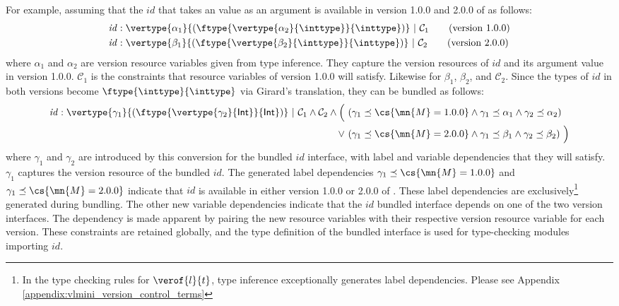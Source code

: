 For example, assuming that the $\mathit{id}$ that takes an \inttype{} value as an argument is available in version 1.0.0 and 2.0.0 of  as follows:
\begin{align*}
\mathit{id} &: \vertype{\alpha_1}{(\ftype{\vertype{\alpha_2}{\inttype}}{\inttype})}\ |\ \mathcal{C}_1 \tag{\textnormal{version 1.0.0}}\\
\mathit{id} &: \vertype{\beta_1}{(\ftype{\vertype{\beta_2}{\inttype}}{\inttype})}\ |\ \mathcal{C}_2 \tag{\textnormal{version 2.0.0}}
\end{align*}
where $\alpha_1$ and $\alpha_2$ are version resource variables given from type inference. They capture the version resources of $\mathit{id}$ and its argument value in version 1.0.0. $\mathcal{C}_1$ is the constraints that resource variables of version 1.0.0 will satisfy. Likewise for $\beta_1$, $\beta_2$, and $\mathcal{C}_2$.
Since the types of $\mathit{id}$ in both versions become $\ftype{\inttype}{\inttype}$ via Girard's translation, they can be bundled as follows:
\begin{align*}
\mathit{id} : \vertype{\gamma_1}{(\ftype{\vertype{\gamma_2}{\textsf{Int}}}{\textsf{Int}})}\ |\
\mathcal{C}_1 \land \mathcal{C}_2 \land \Bigl(\ 
     &(\gamma_1 \preceq \cs{\mn{M} = 1.0.0} \land \gamma_1 \preceq \alpha_1 \land \gamma_2 \preceq \alpha_2)\\
\lor\ &(\gamma_1 \preceq \cs{\mn{M} = 2.0.0} \land \gamma_1 \preceq \beta_1 \land \gamma_2 \preceq \beta_2)\ \Bigr)
\end{align*}
where $\gamma_1$ and $\gamma_2$ are introduced by this conversion for the bundled $id$ interface, with label and variable dependencies that they will satisfy.
$\gamma_1$ captures the version resource of the bundled $\mathit{id}$. The generated label dependencies $\gamma_1 \preceq \cs{ = 1.0.0}$ and $\gamma_1 \preceq \cs{\mn{M} = 2.0.0}$ indicate that $\mathit{id}$ is available in either version 1.0.0 or 2.0.0 of \mn{M}.
These label dependencies are exclusively\footnote{In the type checking rules for $\verof{l}{t}$, type inference exceptionally generates label dependencies. Please see Appendix \ref{appendix:vlmini_version_control_terms}} generated during bundling.
The other new variable dependencies indicate that the $\mathit{id}$ bundled interface depends on one of the two version interfaces. The dependency is made apparent by pairing the new resource variables with their respective version resource variable for each version.
These constraints are retained globally, and the type definition of the bundled interface is used for type-checking modules importing $\mathit{id}$. 


